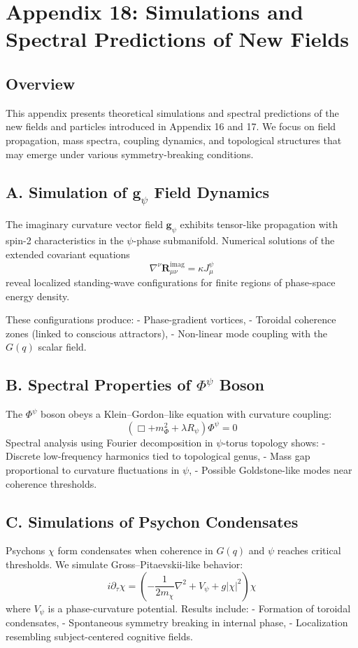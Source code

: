 

\appendix
\section*{Appendix 18: Simulations and Spectral Predictions of New Fields}

\subsection*{Overview}
This appendix presents theoretical simulations and spectral predictions of the new fields and particles introduced in Appendix 16 and 17. We focus on field propagation, mass spectra, coupling dynamics, and topological structures that may emerge under various symmetry-breaking conditions.

\subsection*{A. Simulation of $\mathbf{g}_\psi$ Field Dynamics}
The imaginary curvature vector field $\mathbf{g}_\psi$ exhibits tensor-like propagation with spin-2 characteristics in the $\psi$-phase submanifold. Numerical solutions of the extended covariant equations
\[
\nabla^\nu \mathbf{R}_{\mu\nu}^{\mathrm{imag}} = \kappa J_\mu^\psi
\]
reveal localized standing-wave configurations for finite regions of phase-space energy density.

These configurations produce:
- Phase-gradient vortices,
- Toroidal coherence zones (linked to conscious attractors),
- Non-linear mode coupling with the $G(q)$ scalar field.

\subsection*{B. Spectral Properties of $\Phi^\psi$ Boson}
The $\Phi^\psi$ boson obeys a Klein–Gordon–like equation with curvature coupling:
\[
\left( \Box + m_\Phi^2 + \lambda R_\psi \right)\Phi^\psi = 0
\]
Spectral analysis using Fourier decomposition in $\psi$-torus topology shows:
- Discrete low-frequency harmonics tied to topological genus,
- Mass gap proportional to curvature fluctuations in $\psi$,
- Possible Goldstone-like modes near coherence thresholds.

\subsection*{C. Simulations of Psychon Condensates}
Psychons $\chi$ form condensates when coherence in $G(q)$ and $\psi$ reaches critical thresholds. We simulate Gross–Pitaevskii-like behavior:
\[
i\partial_\tau \chi = \left( -\frac{1}{2m_\chi} \nabla^2 + V_\psi + g|\chi|^2 \right)\chi
\]
where $V_\psi$ is a phase-curvature potential. Results include:
- Formation of toroidal condensates,
- Spontaneous symmetry breaking in internal phase,
- Localization resembling subject-centered cognitive fields.

